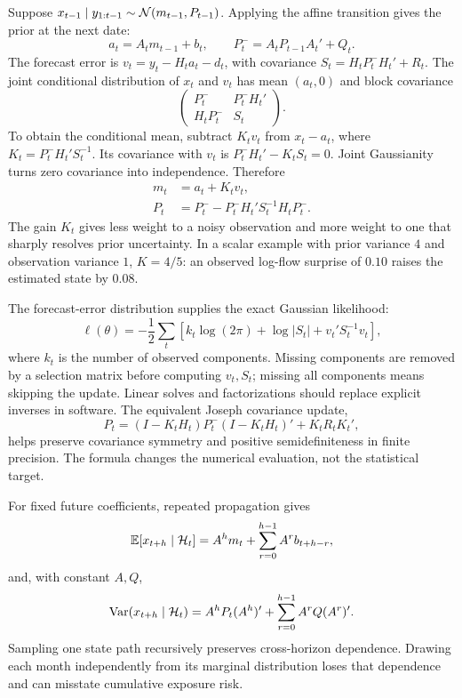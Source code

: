 Suppose $x_{t-1}\mid y_{1:t-1}\sim\mathcal N(m_{t-1},P_{t-1})$. Applying the affine transition gives the prior at the next date:
\begin{equation}
a_t=A_t m_{t-1}+b_t,\qquad
P_t^-=A_tP_{t-1}A_t'+Q_t.
\end{equation}
The forecast error is $v_t=y_t-H_ta_t-d_t$, with covariance $S_t=H_tP_t^-H_t'+R_t$. The joint conditional distribution of $x_t$ and $v_t$ has mean $(a_t,0)$ and block covariance
\begin{equation}
\begin{pmatrix}
P_t^- & P_t^-H_t'\\
H_tP_t^- & S_t
\end{pmatrix}.
\end{equation}
To obtain the conditional mean, subtract $K_tv_t$ from $x_t-a_t$, where $K_t=P_t^-H_t'S_t^{-1}$. Its covariance with $v_t$ is $P_t^-H_t'-K_tS_t=0$. Joint Gaussianity turns zero covariance into independence. Therefore
\begin{align}
m_t&=a_t+K_tv_t,\\
P_t&=P_t^- -P_t^-H_t'S_t^{-1}H_tP_t^-.
\label{eq:filter}
\end{align}
The gain $K_t$ gives less weight to a noisy observation and more weight to one that sharply resolves prior uncertainty. In a scalar example with prior variance $4$ and observation variance $1$, $K=4/5$: an observed log-flow surprise of $0.10$ raises the estimated state by $0.08$.

The forecast-error distribution supplies the exact Gaussian likelihood:
\begin{equation}
\ell(\theta)=-\frac12\sum_t
\left[k_t\log(2\pi)+\log|S_t|+v_t'S_t^{-1}v_t\right],
\label{eq:kalmanlik}
\end{equation}
where $k_t$ is the number of observed components. Missing components are removed by a selection matrix before computing $v_t,S_t$; missing all components means skipping the update. Linear solves and factorizations should replace explicit inverses in software. The equivalent Joseph covariance update,
\begin{equation}
P_t=(I-K_tH_t)P_t^-(I-K_tH_t)'+K_tR_tK_t',
\end{equation}
helps preserve covariance symmetry and positive semidefiniteness in finite precision. The formula changes the numerical evaluation, not the statistical target.

For fixed future coefficients, repeated propagation gives
\begin{equation}
\mathbb E[x_{t+h}\mid\mathcal H_t]=A^h m_t+\sum_{r=0}^{h-1}A^r b_{t+h-r},
\end{equation}
and, with constant $A,Q$,
\begin{equation}
\operatorname{Var}(x_{t+h}\mid\mathcal H_t)=A^hP_t(A^h)'+
\sum_{r=0}^{h-1}A^rQ(A^r)'.
\label{eq:multistep}
\end{equation}
Sampling one state path recursively preserves cross-horizon dependence. Drawing each month independently from its marginal distribution loses that dependence and can misstate cumulative exposure risk.

